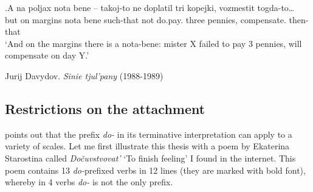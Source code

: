 \exg.\label{ex:do:measure}A na poljax nota bene -- takoj-to ne doplatil tri kopejki, vozmestit togda-to…\\
but on margins nota bene {} such-that not do.pay. three pennies, compensate. then-that\\
\vspace{0.5em}
`And on the margins there is a nota-bene: mister X failed to pay 3 pennies, will compensate on day Y.'\\
\begin{flushright}
\vspace{-0.5em}
Jurij Davydov. \textit{Sinie tjul'pany} (1988-1989)
\end{flushright}

\subsection{Restrictions on the attachment}
\citet[236]{Kagan:12} points out that the prefix \textit{do-} in its terminative interpretation can apply to a variety of scales. Let me first illustrate this thesis with a poem by Ekaterina Starostina called \textit{Do\v{c}uvstvovat'} `To finish feeling' I found in the internet. This poem contains 13 \textit{do-}prefixed verbs in 12 lines (they are marked with bold font), whereby in 4 verbs \textit{do-} is not the only prefix.

